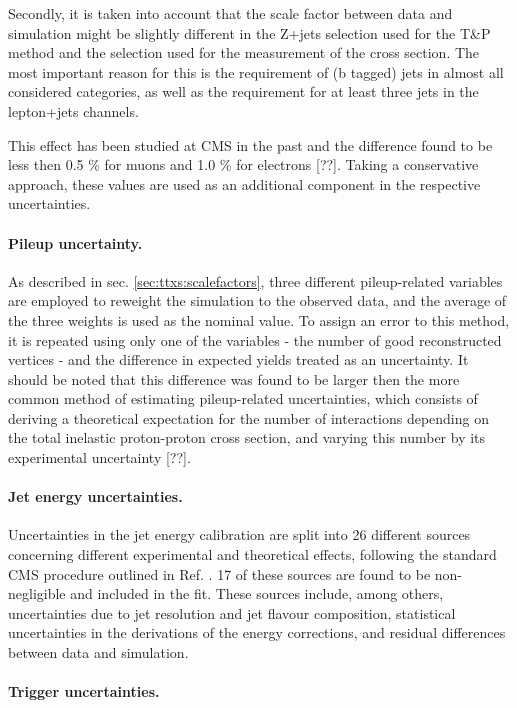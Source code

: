 Secondly, it is taken into account that the scale factor between data and simulation might be slightly different in the Z+jets selection used for the T\&P method and the \ttbar selection used for the measurement of the cross section. The most important reason for this is the requirement of (b tagged) jets in almost all considered categories, as well as the requirement for at least three jets in the lepton+jets channels. 

This effect has been studied at CMS in the past and the difference found to be less then 0.5 \% for muons and 1.0 \% for electrons [??]. Taking a conservative approach, these values are used as an additional component in the respective uncertainties.

\paragraph{Pileup uncertainty.}

As described in sec. \ref{sec:ttxs:scalefactors}, three different pileup-related variables are employed to reweight the simulation to the observed data, and the average of the three weights is used as the nominal value. To assign an error to this method, it is repeated using only one of the variables - the number of good reconstructed vertices - and the difference in expected yields treated as an uncertainty. It should be noted that this difference was found to be larger then the more common method of estimating pileup-related uncertainties, which consists of deriving a theoretical expectation for the number of interactions depending on the total inelastic proton-proton cross section, and varying this number by its experimental uncertainty [??].

\paragraph{Jet energy uncertainties.}

Uncertainties in the jet energy calibration are split into 26 different sources concerning different experimental and theoretical effects, following the standard CMS procedure outlined in Ref. \cite{CMS:JME-13-004}. 17 of these sources are found to be non-negligible and included in the fit. These sources include, among others, uncertainties due to jet \pt resolution and jet flavour composition, statistical uncertainties in the derivations of the energy corrections, and residual differences between data and simulation.

\paragraph{Trigger uncertainties.}


